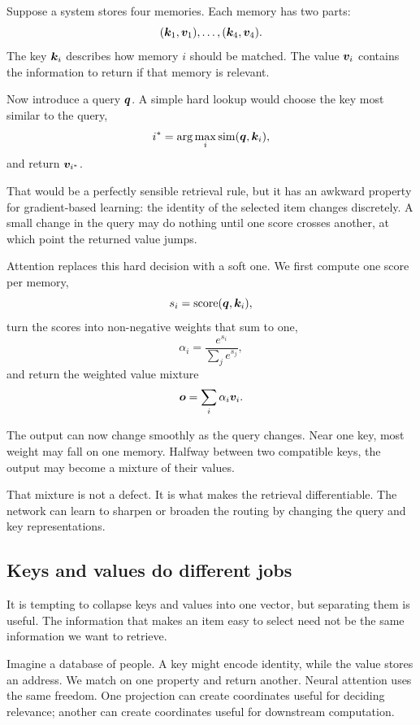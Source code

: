 Suppose a system stores four memories. Each memory has two parts:
\[
  (\bm{k}_1,\bm{v}_1),\ldots,(\bm{k}_4,\bm{v}_4).
\]
The key \(\bm{k}_i\) describes how memory \(i\) should be matched. The value \(\bm{v}_i\) contains the information to return if that memory is relevant.

Now introduce a query \(\bm{q}\). A simple hard lookup would choose the key most similar to the query,
\[
  i^* = \arg\max_i \mathrm{sim}(\bm{q},\bm{k}_i),
\]
and return \(\bm{v}_{i^*}\).

That would be a perfectly sensible retrieval rule, but it has an awkward property for gradient-based learning: the identity of the selected item changes discretely. A small change in the query may do nothing until one score crosses another, at which point the returned value jumps.

Attention replaces this hard decision with a soft one. We first compute one score per memory,
\begin{equation}
  s_i = \mathrm{score}(\bm{q},\bm{k}_i),
\end{equation}
turn the scores into non-negative weights that sum to one,
\begin{equation}
  \alpha_i = \frac{e^{s_i}}{\sum_j e^{s_j}},
\end{equation}
and return the weighted value mixture
\begin{equation}
  \bm{o} = \sum_i \alpha_i\bm{v}_i.
  \label{eq:week9-soft-retrieval}
\end{equation}

The output can now change smoothly as the query changes. Near one key, most weight may fall on one memory. Halfway between two compatible keys, the output may become a mixture of their values.

That mixture is not a defect. It is what makes the retrieval differentiable. The network can learn to sharpen or broaden the routing by changing the query and key representations.

\subsection{Keys and values do different jobs}

It is tempting to collapse keys and values into one vector, but separating them is useful. The information that makes an item easy to select need not be the same information we want to retrieve.

Imagine a database of people. A key might encode identity, while the value stores an address. We match on one property and return another. Neural attention uses the same freedom. One projection can create coordinates useful for deciding relevance; another can create coordinates useful for downstream computation.

